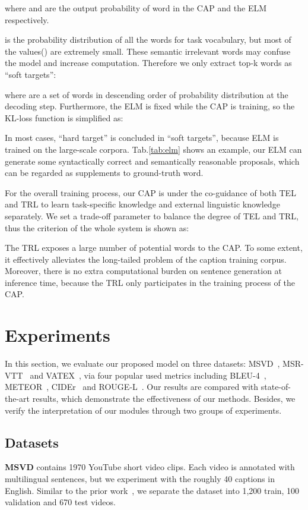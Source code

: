 \documentclass[10pt,twocolumn,letterpaper]{article}
\begin{document}
where  and  are the output probability of word  in the CAP and the ELM respectively.

 is the probability distribution of all the words for task vocabulary, but most of the values() are extremely small. These semantic irrelevant words may confuse the model and increase computation. Therefore we only extract top-k words as ``soft targets'':

where  are a set of words in descending order of probability distribution  at the  decoding step. Furthermore, the ELM is fixed while the CAP is training, so the KL-loss function is simplified as:


In most cases, ``hard target'' is concluded in ``soft targets'', because ELM is trained on the large-scale corpora. Tab.\ref{tab:elm} shows an example, our ELM can generate some syntactically correct and semantically reasonable proposals, which can be regarded as supplements to ground-truth word.

For the overall training process, our CAP is under the co-guidance of both TEL and TRL to learn task-specific knowledge and external linguistic knowledge separately. We set a trade-off parameter  to balance the degree of TEL and TRL, thus the criterion of the whole system is shown as:


The TRL exposes a large number of potential words to the CAP. To some extent, it effectively alleviates the long-tailed problem of the caption training corpus. Moreover, there is no extra computational burden on sentence generation at inference time, because the TRL only participates in the training process of the CAP. 




\section{Experiments}
In this section, we evaluate our proposed model on three datasets: MSVD~\cite{Chen2011}, MSR-VTT~\cite{Xu2016} and VATEX~\cite{Wang2019}, via four popular used metrics including BLEU-4~\cite{Papineni2002}, METEOR~\cite{Denkowski2014}, CIDEr~\cite{Vedantam2015} and ROUGE-L~\cite{Lin2004}. Our results are compared with state-of-the-art results, which demonstrate the effectiveness of our methods. Besides, we verify the interpretation of our modules through two groups of experiments.


\subsection{Datasets}
\textbf{MSVD} contains 1970 YouTube short video clips. Each video is annotated with multilingual sentences, but we experiment with the roughly 40 captions in English. Similar to the prior work~\cite{Venugopalan2015b}, we separate the dataset into 1,200 train, 100 validation and 670 test videos.
\end{document}
